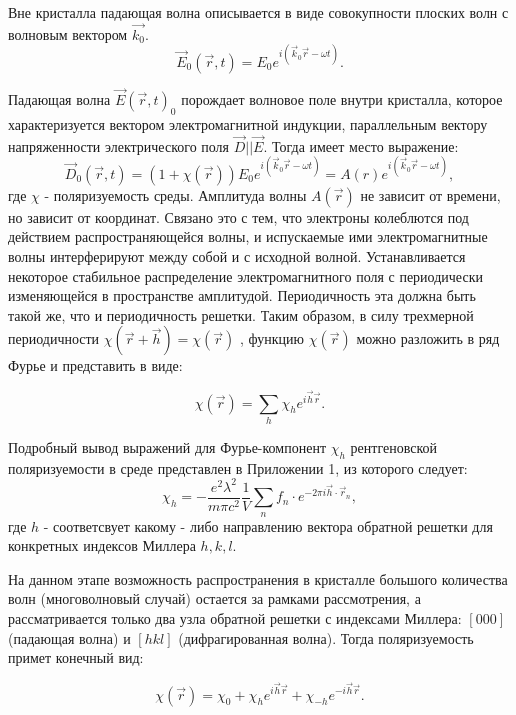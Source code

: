 
Вне кристалла падающая волна описывается в виде совокупности плоских волн с волновым вектором  $\vec{k_0}$.
\begin{equation}
  \vec{E}_0(\vec{r},t) = E_0 e^{i(\vec{k}_0\vec{r}-\omega t)}.
 \end{equation}

Падающая волна $\vec{E}(\vec{r},t)_0$ порождает волновое поле внутри кристалла, которое характеризуется вектором
электромагнитной индукции, параллельным вектору напряженности электрического поля $\vec{D}||\vec{E}$. Тогда
имеет место выражение:
\begin{equation}
 \vec{D}_0(\vec{r},t) = (1+\chi(\vec{r})) E_0 e^{i(\vec{k}_0\vec{r}-\omega t)} = A(r) e^{i(\vec{k}_0\vec{r}-\omega t)},
\end{equation}
 \noindent
где $\chi$ - поляризуемость среды. Амплитуда волны $A(\vec{r})$ не зависит
от времени, но зависит от координат. Связано это с тем, что электроны колеблются
под действием распространяющейся волны, и испускаемые ими электромагнитные волны
интерферируют между собой и с исходной волной. Устанавливается некоторое стабильное распределение
электромагнитного поля с периодически изменяющейся в пространстве амплитудой. Периодичность эта должна быть
такой же, что и периодичность решетки. Таким образом, в силу трехмерной периодичности $\chi(\vec{r}+\vec{h}) = \chi(\vec{r})$
, функцию $\chi(\vec{r})$ можно разложить в ряд Фурье и представить в виде:

\begin{equation}
\chi(\vec{r}) = \sum_{h}\chi_h e^{i\vec{h}\vec{r}}.
\end{equation}

Подробный вывод выражений для Фурье-компонент $\chi_h$ рентгеновской поляризуемости
 в среде представлен в Приложении 1, из которого следует:
\begin{equation}
\chi_h = -\frac{e^2 \lambda^2}{m \pi c^2} \frac{1}{V} \sum_{n} f_n \cdot e^{-2\pi i\vec{h}\cdot \vec{r}_n},
\end{equation}
\noindent
где $h$ - соответсвует какому - либо направлению вектора обратной решетки для конкретных индексов Миллера $h, k, l$.

На данном этапе возможность распространения в кристалле большого количества
волн (многоволновый случай) остается за рамками рассмотрения, а
рассматривается только два узла обратной решетки с индексами Миллера:
$[000]$ (падающая волна) и $[hkl]$ (дифрагированная волна).
Тогда поляризуемость примет конечный вид:

\begin{equation}
\chi(\vec{r}) = \chi_0 + \chi_h e^{i\vec{h}\vec{r}} + \chi_{-h} e^{-i\vec{h}\vec{r}}.
\end{equation}


